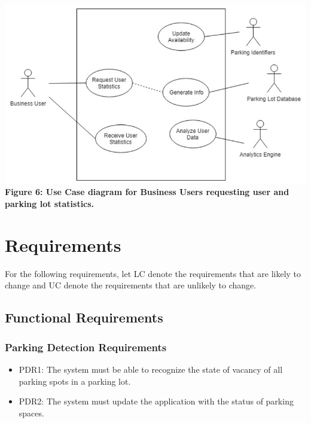 \documentclass[]{article}
\begin{document}
\begin{center}
	\includegraphics[width=\textwidth,height=\textheight,keepaspectratio]{uc4}
	\textbf{Figure 6: Use Case diagram for Business Users requesting user and parking lot statistics.}
\end{center}
	

\section{Requirements}
For the following requirements, let LC denote the requirements that are likely to change and UC denote the requirements that are unlikely to change.
\subsection{Functional Requirements}
	\subsubsection{Parking Detection Requirements}
	\begin{itemize}
		\item PDR1: The system must be able to recognize the state of vacancy of all parking spots in a parking lot. 
		\item PDR2:  The system must update the application with the status of parking spaces.
	\end{itemize}
\end{document}
